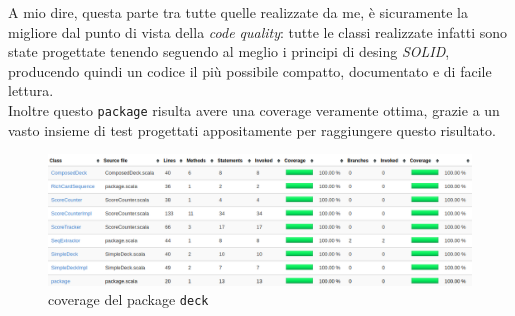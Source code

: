 \begin{itemize}
	A mio dire, questa parte tra tutte quelle realizzate da me, è sicuramente la migliore dal punto di vista della \textit{code quality}: tutte le classi realizzate infatti sono state progettate tenendo seguendo al meglio i principi di desing \textit{SOLID}, producendo quindi un codice il più possibile compatto, documentato e di facile lettura.\\
	Inoltre questo \texttt{package} risulta avere una coverage veramente ottima, grazie a un vasto insieme di test progettati appositamente per raggiungere questo risultato. 
	
	\begin{figure}[H]
		\includegraphics[width=\textwidth,height=\textheight,keepaspectratio]{deckCoverage}
		\caption{coverage del package \texttt{deck}}
	\end{figure}
	

\end{itemize}

